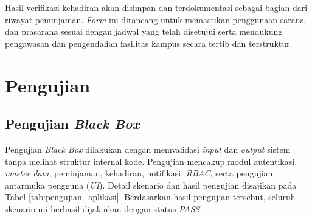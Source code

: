Hasil verifikasi kehadiran akan disimpan dan terdokumentasi sebagai bagian dari riwayat peminjaman. \textit{Form} ini dirancang untuk memastikan penggunaan sarana dan prasarana sesuai dengan jadwal yang telah disetujui serta mendukung pengawasan dan pengendalian fasilitas kampus secara tertib dan terstruktur.

\section{Pengujian}

\subsection{Pengujian \textit{Black Box}}
Pengujian \textit{Black Box} dilakukan dengan memvalidasi \textit{input} dan \textit{output} sistem tanpa melihat struktur internal kode. Pengujian mencakup modul autentikasi, \textit{master data}, peminjaman, kehadiran, notifikasi, \textit{RBAC}, serta pengujian antarmuka pengguna (\textit{UI}). Detail skenario dan hasil pengujian disajikan pada Tabel \ref{tab:pengujian_aplikasi}. Berdasarkan hasil pengujian tersebut, seluruh skenario uji berhasil dijalankan dengan status \textit{PASS}.

